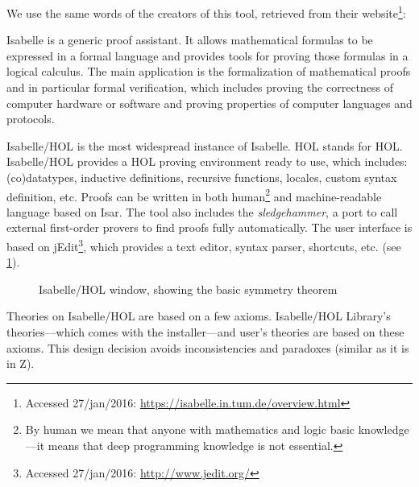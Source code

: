 %
\begin{isabellebody}%
%
%
\isadelimtheory
%
\endisadelimtheory
%
\isatagtheory
%
\endisatagtheory
{\isafoldtheory}%
%
\isadelimtheory
%
\endisadelimtheory
%
\begin{isamarkuptext}%
We use the same words of the creators of this tool, retrieved from their 
website\footnote{Accessed 27/jan/2016: \url{https://isabelle.in.tum.de/overview.html}}:
%
\begin{citacao}
Isabelle is a generic proof assistant. It allows mathematical formulas to be expressed in a formal 
language and provides tools for proving those formulas in a logical calculus. 
%
The main application is the formalization of mathematical proofs and in particular formal verification, 
which includes proving the correctness of computer hardware or software and proving properties of 
computer languages and protocols.
\end{citacao}%
\end{isamarkuptext}\isamarkuptrue%
%
\begin{isamarkuptext}%
Isabelle/HOL is the most widespread instance of Isabelle. 
\acs{HOL} stands for \acl{HOL}.
%
Isabelle/HOL provides a \ac{HOL} proving environment ready to use, which includes: (co)datatypes, 
inductive definitions, recursive functions, locales, custom syntax definition, etc.
%
Proofs can be written in both human\footnote{By human we mean that anyone with mathematics and logic 
basic knowledge---it means that deep programming knowledge is not essential.} and machine-readable 
language based on \ac{Isar}.
%
The tool also includes the \emph{sledgehammer}, a port to call external first-order provers to find
proofs fully automatically.
%
The user interface is based on jEdit\footnote{Accessed 27/jan/2016: \url{http://www.jedit.org/}}, 
which provides a text editor, syntax parser, shortcuts, etc. (see 
\cref{fig:basic-symmetry-isabelle-window}).

\begin{figure}[t]
  \centering
  \caption{Isabelle/HOL window, showing the basic symmetry theorem}
  \label{fig:basic-symmetry-isabelle-window}
\end{figure}

Theories on Isabelle/HOL are based on a few axioms.
%
Isabelle/HOL Library's theories---which comes with the installer---and user's theories are based on 
these axioms.
%
This design decision avoids inconsistencies and paradoxes (similar as it is in \ac{Z}).


\end{isamarkuptext}
\end{isabellebody}
